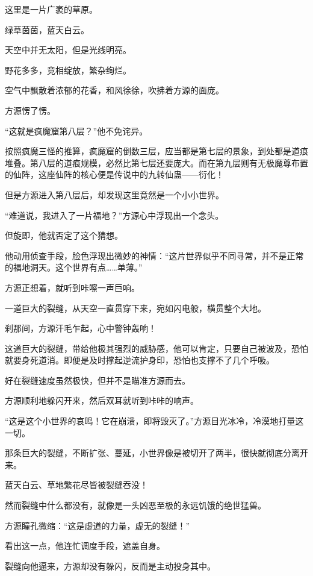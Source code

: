 
\begin{this_body}

这里是一片广袤的草原。

绿草茵茵，蓝天白云。

天空中并无太阳，但是光线明亮。

野花多多，竞相绽放，繁杂绚烂。

空气中飘散着浓郁的花香，和风徐徐，吹拂着方源的面庞。

方源愣了愣。

“这就是疯魔窟第八层？”他不免诧异。

按照疯魔三怪的推算，疯魔窟的倒数三层，应当都是第七层的景象，到处都是道痕堆叠。第八层的道痕规模，必然比第七层还要庞大。而在第九层则有无极魔尊布置的仙阵，这座仙阵的核心便是传说中的九转仙蛊——衍化！

但是方源进入第八层后，却发现这里竟然是一个小小世界。

“难道说，我进入了一片福地？”方源心中浮现出一个念头。

但旋即，他就否定了这个猜想。

他动用侦查手段，脸色浮现出微妙的神情：“这片世界似乎不同寻常，并不是正常的福地洞天。这个世界有点……单薄。”

方源正想着，就听到咔嚓一声巨响。

一道巨大的裂缝，从天空一直贯穿下来，宛如闪电般，横贯整个大地。

刹那间，方源汗毛乍起，心中警钟轰响！

这道巨大的裂缝，带给他极其强烈的威胁感，他可以肯定，只要自己被波及，恐怕就要身死道消。即便是及时撑起逆流护身印，恐怕也支撑不了几个呼吸。

好在裂缝速度虽然极快，但并不是瞄准方源而去。

方源顺利地躲闪开来，然后双耳就听到咔咔的响声。

“这是这个小世界的哀鸣！它在崩溃，即将毁灭了。”方源目光冰冷，冷漠地打量这一切。

那条巨大的裂缝，不断扩张、蔓延，小世界像是被切开了两半，很快就彻底分离开来。

蓝天白云、草地繁花尽皆被裂缝吞没！

然而裂缝中什么都没有，就像是一头凶恶至极的永远饥饿的绝世猛兽。

方源瞳孔微缩：“这是虚道的力量，虚无的裂缝！”

看出这一点，他连忙调度手段，遮盖自身。

裂缝向他逼来，方源却没有躲闪，反而是主动投身其中。


\end{this_body}
